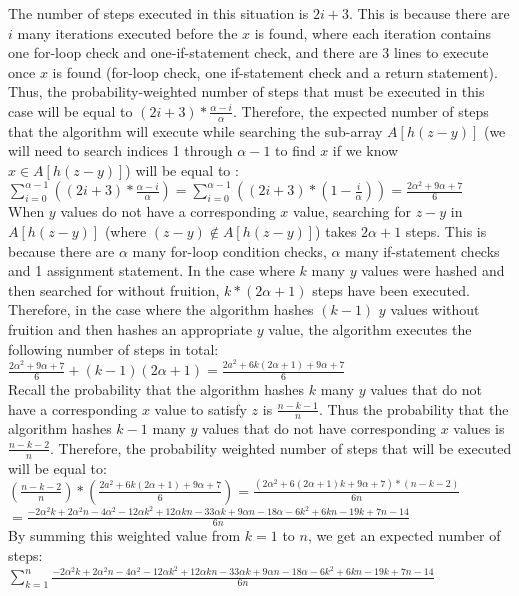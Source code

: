 The number of steps executed in this situation is $2i + 3$. This is because there are $i$ many iterations executed before the $x$ is found, where each iteration contains one for-loop check and one-if-statement check, and there are 3 lines to execute once $x$ is found (for-loop check, one if-statement check and a return statement). Thus, the probability-weighted number of steps that must be executed in this case will be equal to $(2i+ 3) * \frac{\alpha - i}{\alpha}$. Therefore, the expected number of steps that the algorithm will execute while searching the sub-array $A[h(z - y)]$ (we will need to search indices 1 through $\alpha - 1$ to find $x$ if we know $x \in A[h(z - y)]$) will be equal to : \\
$\sum\limits_{i=0}^{\alpha - 1}((2i+ 3) * \frac{\alpha - i}{\alpha}) = \sum\limits_{i=0}^{\alpha - 1}((2i+ 3) * (1 -\frac{i}{\alpha})) = \frac{2\alpha^2 + 9\alpha + 7}{6}$\\

When $y$ values do not have a corresponding $x$ value, searching for $z - y$ in $A[h(z - y)]$ (where $(z - y) \not \in A[h(z - y)]$) takes $2\alpha + 1$ steps. This is because there are $\alpha$ many for-loop condition checks, $\alpha$ many if-statement checks and 1 assignment statement. In the case where $k$ many $y$ values were hashed and then searched for without fruition, $k* (2\alpha + 1)$ steps have been executed. Therefore, in the case where the algorithm hashes $(k - 1)$ $y$ values without fruition and then hashes an appropriate $y$ value, the algorithm executes the following number of steps in total: \\
$\frac{2\alpha^2 + 9\alpha + 7}{6} + (k-1)(2\alpha + 1) = \frac{2a^2 + 6k(2\alpha + 1) + 9\alpha + 7}{6}$\\

Recall the probability that the algorithm hashes $k$ many $y$ values that do not have a corresponding $x$ value to satisfy $z$ is $\frac{n - k - 1}{n}$. Thus the probability that the algorithm hashes $k-1$ many $y$ values that do not have corresponding $x$ values is $\frac{n - k - 2}{n}$. Therefore, the probability weighted number of steps that will be executed will be equal to: \\
$(\frac{n - k - 2}{n})*(\frac{2a^2 + 6k(2\alpha + 1) + 9\alpha + 7}{6}) = \frac{(2\alpha^2 + 6(2\alpha + 1)k + 9\alpha + 7)*(n - k - 2)}{6n}$ \\
$ = \frac{-2\alpha^2k + 2\alpha^2n -4\alpha^2 - 12\alpha k^2 + 12\alpha kn - 33\alpha k + 9\alpha n - 18\alpha - 6k^2 + 6kn - 19k + 7n- 14}{6n}$ \\

By summing this weighted value from $k = 1$ to $n$, we get an expected number of steps: \\
$\sum\limits_{k=1}^{n} \frac{-2\alpha^2k + 2\alpha^2n -4\alpha^2 - 12\alpha k^2 + 12\alpha kn - 33\alpha k + 9\alpha n - 18\alpha - 6k^2 + 6kn - 19k + 7n- 14}{6n}$
